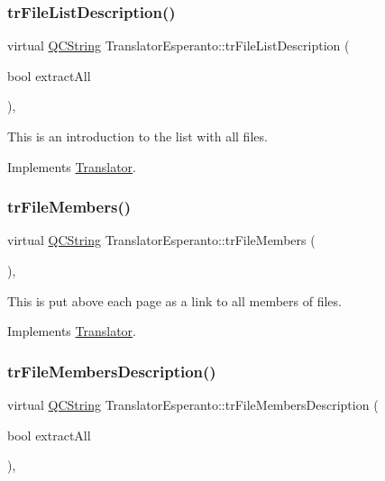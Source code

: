 \subsubsection{\texorpdfstring{trFileListDescription()}{trFileListDescription()}}
{\footnotesize\ttfamily virtual \mbox{\hyperlink{class_q_c_string}{Q\+C\+String}} Translator\+Esperanto\+::tr\+File\+List\+Description (\begin{DoxyParamCaption}\item[{bool}]{extract\+All }\end{DoxyParamCaption})\hspace{0.3cm}{\ttfamily [inline]}, {\ttfamily [virtual]}}

This is an introduction to the list with all files. 

Implements \mbox{\hyperlink{class_translator}{Translator}}.

\mbox{\label{class_translator_esperanto_ac8ac2bc0441c95505fe1d7dbeb012ffe}} 
\subsubsection{\texorpdfstring{trFileMembers()}{trFileMembers()}}
{\footnotesize\ttfamily virtual \mbox{\hyperlink{class_q_c_string}{Q\+C\+String}} Translator\+Esperanto\+::tr\+File\+Members (\begin{DoxyParamCaption}{ }\end{DoxyParamCaption})\hspace{0.3cm}{\ttfamily [inline]}, {\ttfamily [virtual]}}

This is put above each page as a link to all members of files. 

Implements \mbox{\hyperlink{class_translator}{Translator}}.

\mbox{\label{class_translator_esperanto_a9fe1e36b574401b2945b55e50a8fa578}} 
\subsubsection{\texorpdfstring{trFileMembersDescription()}{trFileMembersDescription()}}
{\footnotesize\ttfamily virtual \mbox{\hyperlink{class_q_c_string}{Q\+C\+String}} Translator\+Esperanto\+::tr\+File\+Members\+Description (\begin{DoxyParamCaption}\item[{bool}]{extract\+All }\end{DoxyParamCaption})\hspace{0.3cm}{\ttfamily [inline]}, {\ttfamily [virtual]}}

